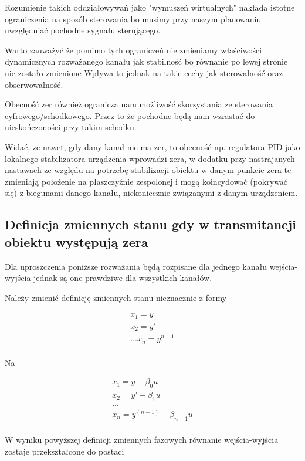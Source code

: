 \documentclass{article}
\begin{document}
	Rozumienie takich oddziałowywań jako "wymuszeń wirtualnych" nakłada istotne ograniczenia
	na sposób sterowania bo musimy przy naszym planowaniu uwzględniać pochodne sygnału
	sterującego.

	Warto zauważyć że pomimo tych ograniczeń nie zmieniamy właściwości dynamicznych
	rozważanego kanału jak stabilność bo równanie po lewej stronie nie zostało zmienione
	Wpływa to jednak na takie cechy jak sterowalność oraz obserwowalność.

	Obecność zer również ogranicza nam możliwość skorzystania ze sterowania
	cyfrowego/schodkowego. Przez to że pochodne będą nam wzrastać do nieskończoności
	przy takim schodku.

	Widać, ze nawet, gdy dany kanał nie ma zer, to obecność np. regulatora PID jako lokalnego
	stabilizatora urządzenia wprowadzi zera, w dodatku przy nastrajanych nastawach
	ze względu na potrzebę stabilizacji obiektu w danym punkcie zera te zmieniają
	położenie na płaszczyźnie zespolonej i mogą koincydować (pokrywać się) z
	biegunami danego kanału, niekoniecznie związanymi z danym urządzeniem.

	\subsection{ Definicja zmiennych stanu gdy w transmitancji obiektu występują zera}

	Dla uproszczenia poniższe rozważania będą rozpisane dla jednego kanału
	wejścia-wyjścia jednak są one prawdziwe dla wszystkich kanałów.

	Należy zmienić definicję zmiennych stanu nieznacznie z formy

		\begin{align*}
			 x_{1} = y  \\
			 x_{2} = y' \\
			...
			 x_{n} = y^{n-1} \\
		\end{align*}

	Na

		\begin{align*}
			 x_{1} = y - \beta_{0}u \\
			 x_{2} = y' - \beta_{1}u \\
			... \\
			 x_{n} = y^{(n-1)} - \beta_{n-1}u \\
		\end{align*}

	W wyniku powyższej definicji zmiennych fazowych równanie wejścia-wyjścia
	zostaje przekształcone do postaci
\end{document}

